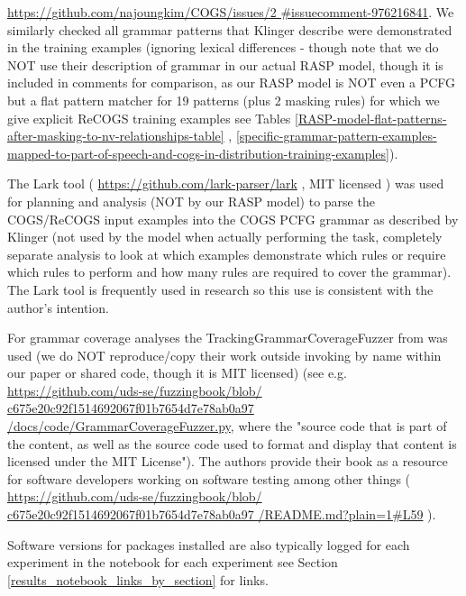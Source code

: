 \documentclass[11pt]{article}
\begin{document}
\href{https://github.com/najoungkim/COGS/issues/2\#issuecomment-976216841}{https://github.com/najoungkim/COGS/issues/2
\#issuecomment-976216841}.
We similarly checked all grammar patterns that Klinger describe were demonstrated in the training examples  (ignoring lexical differences - though note that we do NOT use their description of grammar in our actual RASP model, though it is included in comments for comparison, as our RASP model is NOT even a PCFG but a flat pattern matcher for 19 patterns (plus 2 masking rules) for which we give explicit ReCOGS training examples see Tables \ref{RASP-model-flat-patterns-after-masking-to-nv-relationships-table} , \ref{specific-grammar-pattern-examples-mapped-to-part-of-speech-and-cogs-in-distribution-training-examples}). 

The Lark tool ( \href{https://github.com/lark-parser/lark}{https://github.com/lark-parser/lark} , MIT licensed ) was used for planning and analysis (NOT by our RASP model) to parse the COGS/ReCOGS input examples into the COGS PCFG grammar as described by Klinger (not used by the model when actually performing the task, completely separate analysis to look at which examples demonstrate which rules or require which rules to perform and how many rules are required to cover the grammar). The Lark tool is frequently used in research so this use is consistent with the author's intention.

For grammar coverage analyses the TrackingGrammarCoverageFuzzer from \citep{fuzzingbook2023:GrammarCoverageFuzzer} was used (we do NOT reproduce/copy their work outside invoking by name within our paper or shared code, though it is MIT licensed) (see e.g. \href{https://github.com/uds-se/fuzzingbook/blob/c675e20c92f1514692067f01b7654d7e78ab0a97/docs/code/GrammarCoverageFuzzer.py}{https://github.com/uds-se/fuzzingbook/blob/
c675e20c92f1514692067f01b7654d7e78ab0a97
/docs/code/GrammarCoverageFuzzer.py}, where the "source code that is part of the content, as well as the source code used to format and display that content is licensed under the MIT License"). The authors \citep{fuzzingbook2023:GrammarCoverageFuzzer} provide their book as a resource for software developers working on software testing among other things ( \href{https://github.com/uds-se/fuzzingbook/blob/c675e20c92f1514692067f01b7654d7e78ab0a97/README.md?plain=1#L59}{https://github.com/uds-se/fuzzingbook/blob/
c675e20c92f1514692067f01b7654d7e78ab0a97
/README.md?plain=1\#L59} ).

Software versions for packages installed are also typically logged for each experiment in the notebook for each experiment see Section \ref{results_notebook_links_by_section} for links.
\end{document}
